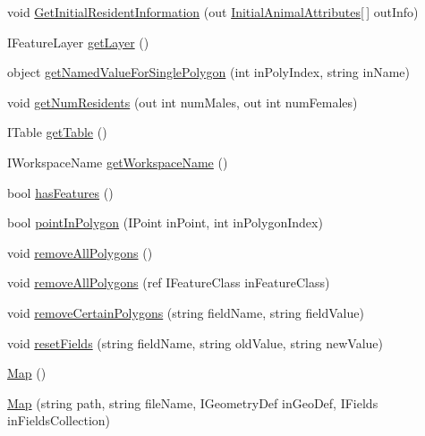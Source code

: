 \begin{DoxyCompactItemize}
\item 
void \hyperlink{class_p_a_z___dispersal_1_1_map_ad35a4c57fc77f39fab48ab520a25145b}{Get\-Initial\-Resident\-Information} (out \hyperlink{class_p_a_z___dispersal_1_1_initial_animal_attributes}{Initial\-Animal\-Attributes}\mbox{[}$\,$\mbox{]} out\-Info)
\item 
I\-Feature\-Layer \hyperlink{class_p_a_z___dispersal_1_1_map_a4b5e18dfbed3fc6cfcae7f7c2ec8394d}{get\-Layer} ()
\item 
object \hyperlink{class_p_a_z___dispersal_1_1_map_a822c42e101de901d15ec711098fed6df}{get\-Named\-Value\-For\-Single\-Polygon} (int in\-Poly\-Index, string in\-Name)
\item 
void \hyperlink{class_p_a_z___dispersal_1_1_map_a2d915882460146cf0fca0f1317a10a34}{get\-Num\-Residents} (out int num\-Males, out int num\-Females)
\item 
I\-Table \hyperlink{class_p_a_z___dispersal_1_1_map_a583d199cf8d0bcf15981af7e7d1739b1}{get\-Table} ()
\item 
I\-Workspace\-Name \hyperlink{class_p_a_z___dispersal_1_1_map_a986245f48c3c2cce40fd845e50260796}{get\-Workspace\-Name} ()
\item 
bool \hyperlink{class_p_a_z___dispersal_1_1_map_a05b6c54024f4ef0863964e186817d97e}{has\-Features} ()
\item 
bool \hyperlink{class_p_a_z___dispersal_1_1_map_a7fdcb164f88e7368615f5c2444274fc3}{point\-In\-Polygon} (I\-Point in\-Point, int in\-Polygon\-Index)
\item 
void \hyperlink{class_p_a_z___dispersal_1_1_map_a9fc8045a7fa24e7f8fa69e4079bfc5b2}{remove\-All\-Polygons} ()
\item 
void \hyperlink{class_p_a_z___dispersal_1_1_map_afec7a23f2efda1b9063ed8d5fefdaa79}{remove\-All\-Polygons} (ref I\-Feature\-Class in\-Feature\-Class)
\item 
void \hyperlink{class_p_a_z___dispersal_1_1_map_a254e0775cdabc009611843446e0a9a09}{remove\-Certain\-Polygons} (string field\-Name, string field\-Value)
\item 
void \hyperlink{class_p_a_z___dispersal_1_1_map_afff200d1c7cbe5a542a45b6832ba1f57}{reset\-Fields} (string field\-Name, string old\-Value, string new\-Value)
\item 
\hyperlink{class_p_a_z___dispersal_1_1_map_a013d473aad115021c6c4505724ad2464}{Map} ()
\item 
\hyperlink{class_p_a_z___dispersal_1_1_map_a568ad2f5e9a14ce17a6b77f2a82dd4e4}{Map} (string path, string file\-Name, I\-Geometry\-Def in\-Geo\-Def, I\-Fields in\-Fields\-Collection)

\end{DoxyCompactItemize}
